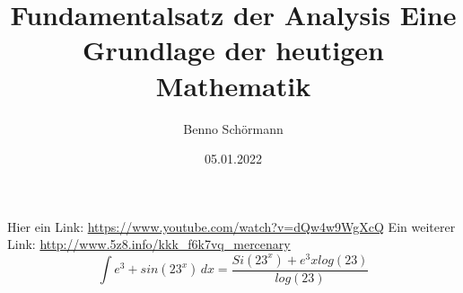 \documentclass[12pt,a4paper,draft]{article}
\begin{document}
\title{Fundamentalsatz der Analysis\newline
\newline Eine Grundlage der heutigen Mathematik}
\author{Benno Schörmann}
\date{05.01.2022}
\maketitle
Hier ein Link: \url{https://www.youtube.com/watch?v=dQw4w9WgXcQ} \newline
Ein weiterer Link: \url{http://www.5z8.info/kkk_f6k7vq_mercenary}
\begin{equation}
	\int {e}^{3}+sin({23}^{x}) \,dx = \frac{Si({23}^{x})+{e}^{3}xlog(23)}{log(23)}
\end{equation}
\end{document}
